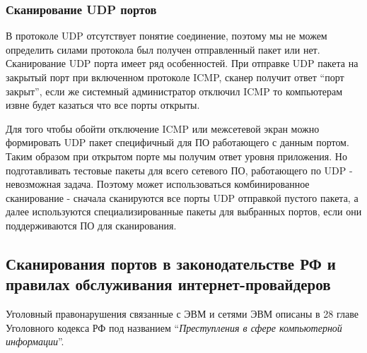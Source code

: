 \hypertarget{ux441ux43aux430ux43dux438ux440ux43eux432ux430ux43dux438ux435-udp-ux43fux43eux440ux442ux43eux432}{%
\subsubsection{Сканирование UDP
портов}\label{ux441ux43aux430ux43dux438ux440ux43eux432ux430ux43dux438ux435-udp-ux43fux43eux440ux442ux43eux432}}

В протоколе UDP отсутствует понятие соединение, поэтому мы не можем
определить силами протокола был получен отправленный пакет или нет.
Сканирование UDP порта имеет ряд особенностей. При отправке UDP пакета
на закрытый порт при включенном протоколе ICMP, сканер получит ответ
``порт закрыт'', если же системный администратор отключил ICMP то
компьютерам извне будет казаться что все порты открыты.

Для того чтобы обойти отключение ICMP или межсетевой экран можно
формировать UDP пакет специфичный для ПО работающего с данным портом.
Таким образом при открытом порте мы получим ответ уровня приложения. Но
подготавливать тестовые пакеты для всего сетевого ПО, работающего по UDP
- невозможная задача. Поэтому может использоваться комбинированное
сканирование - сначала сканируются все порты UDP отправкой пустого
пакета, а далее используются специализированные пакеты для выбранных
портов, если они поддерживаются ПО для сканирования.

\hypertarget{ux441ux43aux430ux43dux438ux440ux43eux432ux430ux43dux438ux44f-ux43fux43eux440ux442ux43eux432-ux432-ux437ux430ux43aux43eux43dux43eux434ux430ux442ux435ux43bux44cux441ux442ux432ux435-ux440ux444-ux438-ux43fux440ux430ux432ux438ux43bux430ux445-ux43eux431ux441ux43bux443ux436ux438ux432ux430ux43dux438ux44f-ux438ux43dux442ux435ux440ux43dux435ux442-ux43fux440ux43eux432ux430ux439ux434ux435ux440ux43eux432}{%
\subsection{Сканирования портов в законодательстве РФ и правилах
обслуживания
интернет-провайдеров}\label{ux441ux43aux430ux43dux438ux440ux43eux432ux430ux43dux438ux44f-ux43fux43eux440ux442ux43eux432-ux432-ux437ux430ux43aux43eux43dux43eux434ux430ux442ux435ux43bux44cux441ux442ux432ux435-ux440ux444-ux438-ux43fux440ux430ux432ux438ux43bux430ux445-ux43eux431ux441ux43bux443ux436ux438ux432ux430ux43dux438ux44f-ux438ux43dux442ux435ux440ux43dux435ux442-ux43fux440ux43eux432ux430ux439ux434ux435ux440ux43eux432}}

Уголовный правонарушения связанные с ЭВМ и сетями ЭВМ описаны в 28 главе
Уголовного кодекса РФ под названием ``\emph{Преступления в сфере
компьютерной информации}''.
